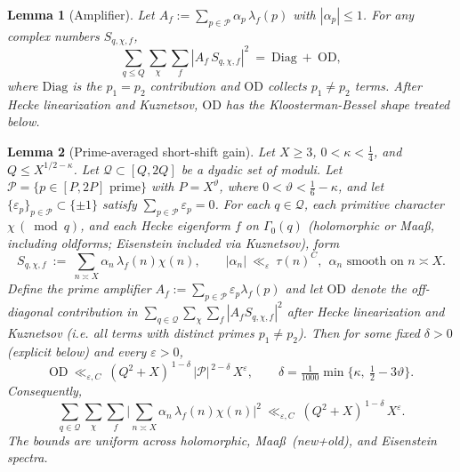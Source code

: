 \documentclass[11pt]{article}
\newtheorem{lemma}{Lemma}[part]
\theoremstyle{definition}
\theoremstyle{remark}
\numberwithin{equation}{part}
\begin{document}
\begin{lemma}[Amplifier]\label{lem:amplifier}
	Let $A_f:=\sum_{p\in\mathcal P}\alpha_p\,\lambda_f(p)$ with $|\alpha_p|\le 1$. For any complex numbers $S_{q,\chi,f}$,
	\[
		\sum_{q\le Q}\sum_{\chi}\sum_f |A_f\,S_{q,\chi,f}|^2
		\ =\ \mathrm{Diag}\ +\ \mathrm{OD},
	\]
	where $\mathrm{Diag}$ is the $p_1=p_2$ contribution and $\mathrm{OD}$ collects $p_1\ne p_2$ terms. After Hecke linearization and Kuznetsov, $\mathrm{OD}$ has the Kloosterman-Bessel shape treated below.
\end{lemma}

\begin{lemma}[Prime-averaged short-shift gain]\label{lem:S2.4}
	Let $X\ge3$, $0<\kappa<\tfrac14$, and $Q\le X^{1/2-\kappa}$. Let $\mathcal Q\subset[Q,2Q]$ be a dyadic set of moduli.
	Let $\mathcal P=\{p\in[P,2P]\text{ prime}\}$ with $P=X^\vartheta$, where $0<\vartheta<\tfrac16-\kappa$, and let $\{\varepsilon_p\}_{p\in\mathcal P}\subset\{\pm1\}$ satisfy $\sum_{p\in\mathcal P}\varepsilon_p=0$. For each $q\in\mathcal Q$, each primitive character $\chi\,(\bmod q)$, and each Hecke eigenform $f$ on $\Gamma_0(q)$ (holomorphic or Maa\ss, including oldforms; Eisenstein included via Kuznetsov), form
	\[
		S_{q,\chi,f} \ :=\ \sum_{n\asymp X}\alpha_n\,\lambda_f(n)\chi(n),
		\qquad
		|\alpha_n|\ \ll_\varepsilon\ \tau(n)^C,\ \ \text{$\alpha_n$ smooth on $n\asymp X$}.
	\]
	Define the prime amplifier $A_f:=\sum_{p\in\mathcal P}\varepsilon_p\lambda_f(p)$ and let $\mathrm{OD}$ denote the off-diagonal contribution in $\sum_{q\in\mathcal Q}\sum_{\chi}\sum_f |A_f S_{q,\chi,f}|^2$ after Hecke linearization and Kuznetsov (i.e. all terms with distinct primes $p_1\ne p_2$).
	Then for some fixed $\delta>0$ (explicit below) and every $\varepsilon>0$,
	\[
		\mathrm{OD}\ \ll_{\varepsilon,C}\ (Q^2+X)^{\,1-\delta}\,|\mathcal P|^{\,2-\delta}\,X^{\varepsilon},
		\qquad
		\delta=\tfrac1{1000}\min\Big\{\kappa,\ \tfrac12-3\vartheta\Big\}.
	\]
	Consequently,
	\[
		\sum_{q\in\mathcal Q}\sum_{\chi}\sum_f \Big|\sum_{n\asymp X}\alpha_n\,\lambda_f(n)\chi(n)\Big|^2
		\ \ll_{\varepsilon,C}\ (Q^2+X)^{\,1-\delta}\,X^{\varepsilon}.
	\]
	The bounds are uniform across holomorphic, Maa\ss\ (new+old), and Eisenstein spectra.
\end{lemma}
\end{document}
